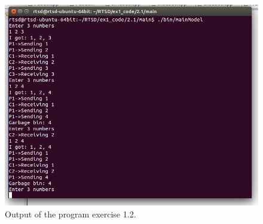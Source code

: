 \documentclass[a4paper,twoside,11pt]{article}
\begin{document}
\begin{figure}
	\centering
	\includegraphics[width=\textwidth]{./images/2-1_output.png}
	\caption{Output of the program exercise 1.2.}
	\label{fig:2_1-output}
\end{figure}

\FloatBarrier
\subsection{}
\subsubsection{}
\end{document}
